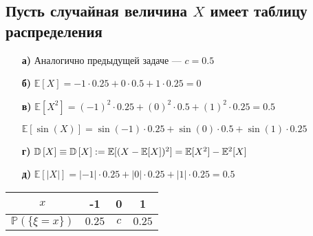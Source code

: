\documentclass{article}
\begin{document}
\subsection{Пусть случайная величина $X$ имеет таблицу распределения}


\begin{itemize}
    \item[\textbf{а)}] Аналогично предыдущей задаче — $c=0.5$

    \item[\textbf{б)}] $\mathbb{E}[X] = -1\cdot0.25 + 0\cdot0.5+1\cdot0.25 = 0$
    \item[\textbf{в)}] $\mathbb{E}[X^2] = (-1)^2\cdot0.25 + (0)^2\cdot0.5 + (1)^2\cdot0.25 = 0.5$

    $\mathbb{E}[\sin{(X)}] = \sin(-1)\cdot0.25 + \sin(0)\cdot0.5 + \sin(1)\cdot0.25$
    \item[\textbf{г)}] $\mathbb{D}\left[X\right] \equiv \mathbb{D}\left[X\right] := \mathbb{E}[(X-\mathbb{E}[X])^2] = \mathbb{E}[X^2]- \mathbb{E}^2[X]$
    \item[\textbf{д)}] $\mathbb{E}[|X|] = |-1|\cdot0.25 + |0|\cdot0.25 + |1|\cdot0.25 = 0.5$

\end{itemize}

\begin{table}[h]
    \begin{tabular}{|c|c|c|c|}
        \hline
        $x$ & -1 & 0 & 1 \\
        \hline
        $\mathbb{P}(\{\xi = x\})$ & $0.25$ & $c$ & $0.25$ \\
        \hline
    \end{tabular}
\end{table}
\end{document}
